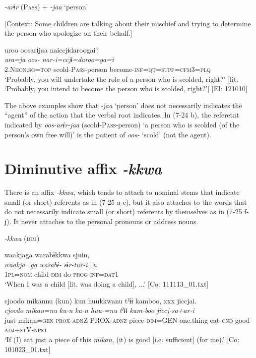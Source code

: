 \ex \label{ex:7:24b}\textit{{}-arɨr} (P\textsc{ass}) + \textit{{}-jaa} ‘person’

    [Context: Some children are talking about their mischief and trying to determine the person who apologize on their behalf.]

\glll  uroo  oosarɨjaa  naiccjɨdaroogai?\\
\textit{ura=ja}  \textit{oos-}  \textit{nar-i=ccjɨ=daroo=ga=i}\\
2.N\textsc{hon}.\textsc{sg}=\textsc{top}  scold-P\textsc{ass}-person  become-\textsc{inf}=\textsc{qt}=\textsc{supp}=\textsc{cfm}3=\textsc{plq}\\
\glt ‘Probably, you will undertake the role of a person who is scolded, right?’ [lit. ‘Probably, you intend to become the person who is scolded, right?’] [El: 121010]
\z
\z

The above examples show that \textit{{}-jaa} ‘person’ does not necessarily indicates the “agent” of the action that the verbal root indicates. In (7-24 b), the referetnt indicated by \textit{oos-arɨr-jaa} (scold-P\textsc{ass}-person) ‘a person who is scolded (of the person’s own free will)’ is the patient of \textit{oos-} ‘scold’ (not the agent).

\section{Diminutive affix \textit{{}-kkwa}}

There is an affix \textit{{}-kkwa}, which tends to attach to nominal stems that indicate small (or short) referents as in (7-25 a-e), but it also attaches to the words that do not necessarily indicate small (or short) referents by themselves as in (7-25 f-j). It never attaches to the personal pronouns or address nouns.

\ea \label{ex:7:25}  \textit{{}-kkwa} (\textsc{dim})

\ea \label{ex:7:25a}%
\glll  waakjaga  warabɨkkwa  sjuin,\\
\textit{waakja=ga}  \textit{warabɨ-}  \textit{sɨr-tur-i=n}\\
1\textsc{pl}=\textsc{nom}  child-\textsc{dim}  do-\textsc{prog}-\textsc{inf}=\textsc{dat}1\\
\glt ‘When I was a child [lit. was doing a child], ...’ [Co: 111113\_01.txt]

\ex \label{ex:7:25b}%
\glll  {\textbar}cjoodo  mikan{\textbar}nu  (kun)  kun  huukkwanu  tˀɨɨ  kamboo,  xxx  jiccjai.\\
\textit{cjoodo}  \textit{mikan=nu}  \textit{ku-n}  \textit{ku-n}  \textit{huu-=nu} \textit{tˀɨɨ}  \textit{kam-boo}    \textit{jiccj-sa+ar-i}\\
just  mikan=\textsc{gen}  \textsc{prox}-\textsc{adn}Z  PROX-\textsc{adnz}  piece-\textsc{dim}=GEN  one.thing  eat-\textsc{cnd}    good-\textsc{adj}+\textsc{st}V-\textsc{npst}\\
\glt ‘If (I) eat just a piece of this \textit{mikan}, (it) is good [i.e. sufficient] (for me).’ [Co: 101023\_01.txt]

